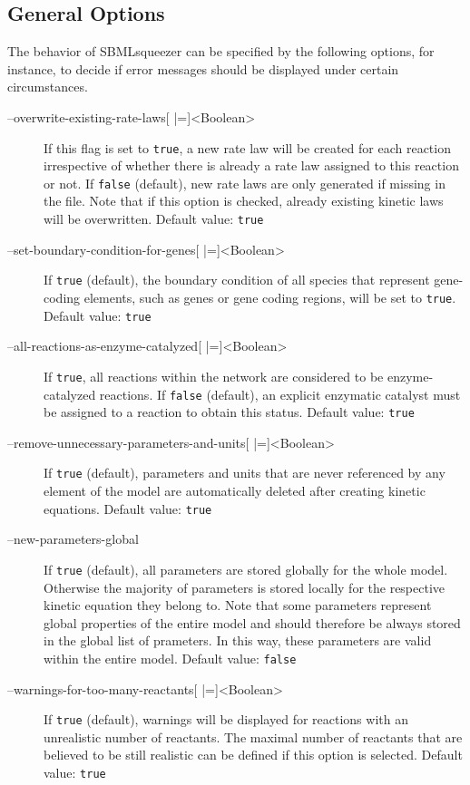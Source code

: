 \subsection{General Options}
The behavior of SBMLsqueezer can be specified by the following options, for
instance, to decide if error messages should be displayed under
certain circumstances.
\begin{description}
\item[--overwrite-existing-rate-laws{[} |={]}<Boolean>]
  If this flag is set to \texttt{true}, a new rate law will be created for
  each reaction irrespective of whether there is already a rate
  law assigned to this reaction or not. If \texttt{false} (default), new
  rate laws are only generated if missing in the \SBML file. Note
  that if this option is checked, already existing kinetic laws
  will be overwritten.
  Default value: \texttt{true}

\item[--set-boundary-condition-for-genes{[} |={]}<Boolean>]
  If \texttt{true} (default), the boundary condition of all species that
  represent gene-coding elements, such as genes or gene coding
  regions, will be set to \texttt{true}.
  Default value: \texttt{true}

\item[--all-reactions-as-enzyme-catalyzed{[} |={]}<Boolean>]
  If \texttt{true}, all reactions within the network are considered to be
  enzyme-catalyzed reactions. If \texttt{false} (default), an explicit
  enzymatic catalyst must be assigned to a reaction to obtain
  this status.
  Default value: \texttt{true}

\item[--remove-unnecessary-parameters-and-units{[} |={]}<Boolean>]
  If \texttt{true} (default), parameters and units that are never referenced
  by any element of the model are automatically deleted after
  creating kinetic equations.
  Default value: \texttt{true}

\item[--new-parameters-global]
  If \texttt{true} (default), all parameters are stored globally for the
  whole model. Otherwise the majority of parameters is stored
  locally for the respective kinetic equation they belong to.
  Note that some parameters represent global properties of the
  entire model and should therefore be always stored in the global
  list of prameters. In this way, these parameters are valid within
  the entire model.
  Default value: \texttt{false}

\item[--warnings-for-too-many-reactants{[} |={]}<Boolean>]
  If \texttt{true} (default), warnings will be displayed for reactions with
  an unrealistic number of reactants. The maximal number of reactants
  that are believed to be still realistic can be defined if this
  option is selected.
  Default value: \texttt{true}


\end{description}
